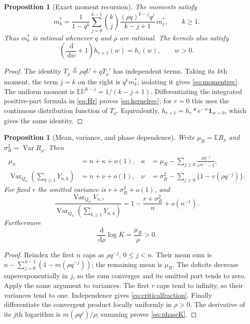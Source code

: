 \documentclass[11pt,oneside]{article}
\numberwithin{equation}{section}
\theoremstyle{plain}
\newtheorem{proposition}[theorem]{Proposition}
\theoremstyle{definition}
\theoremstyle{remark}
\newcommand{\E}{\mathbb E}
\newcommand{\ind}{\mathbf 1}
\newcommand{\dd}{\,\mathrm d}
\newcommand{\Var}{\operatorname{Var}}
\begin{document}
\begin{proposition}[Exact moment recursion]\label{prop:moments}
The moments satisfy
\begin{equation}\label{eq:momentrec}
 m_k^*=
 \frac1{1-q^k}\sum_{j=0}^{k-1}
 \binom kj\frac{(\rho q)^{k-j}q^j}{k-j+1}\,m_j^*,\qquad k\ge1.
\end{equation}
Thus $m_k^*$ is rational whenever $q$ and $\rho$ are rational. The
kernels also satisfy
\begin{equation}\label{eq:kernelrec}
 \left(\frac{\dd}{\dd w}+1\right)h_{r+1}(w)=h_r(w),\qquad w>0.
\end{equation}
\end{proposition}
\begin{proof}
The identity $T_\rho\overset d=\rho qU+qT_\rho'$ has independent terms.
Taking its $k$th moment, the term $j=k$ on the right is $q^km_k^*$;
isolating it gives \eqref{eq:momentrec}. The uniform moment is
$\E U^{k-j}=1/(k-j+1)$. Differentiating the integrated positive-part
formula in \eqref{eq:Hr} proves \eqref{eq:kernelrec}; for $r=0$ this
uses the continuous distribution function of $T_\rho$. Equivalently,
$h_{r+1}=h_r*e^{-w}\ind_{w>0}$, which gives the same identity.
\end{proof}

\begin{proposition}[Mean, variance, and phase dependence]\label{prop:clock}
Write $\mu_R=\E R_\rho$ and $\sigma_R^2=\Var R_\rho$. Then
\begin{align}
 \mu_n&=n+\kappa+o(1),&
 \kappa&=\mu_R-\sum_{j\ge0}\frac{\rho q^{-j}}{e^{\rho q^{-j}}-1},
 \label{eq:kappa}\\
 \Var_{Q_n}\!\left(\sum_{k\ge1}Y_{n,k}\right)&=n+\nu+o(1),&
 \nu&=\sigma_R^2-\sum_{j\ge0}\{1-v(\rho q^{-j})\}.
 \label{eq:nu}
\end{align}
For fixed $r$ the omitted variance is $r+\sigma_R^2+o(1)$, and
\begin{equation}\label{eq:criticalfraction}
 \frac{\Var_{Q_n}V_{n,r}}
 {\Var_{Q_n}(\sum_{k\ge1}Y_{n,k})}
 =1-\frac{r+\sigma_R^2}{n}+o(n^{-1}).
\end{equation}
Furthermore
\begin{equation}\label{eq:phaseK}
 \frac{\dd}{\dd\rho}\log K=\frac{\mu_R}{\rho}>0.
\end{equation}
\end{proposition}
\begin{proof}
Reindex the first $n$ caps as $\rho q^{-j}$, $0\le j<n$. Their
mean sum is $n-\sum_{j=0}^{n-1}(1-m(\rho q^{-j}))$; the remaining
mean is $\mu_R$. The deficits decrease superexponentially in $j$, so
the sum converges and its omitted part tends to zero. Apply the same
argument to variances. The first $r$ caps tend to infinity, so their
variances tend to one. Independence gives \eqref{eq:criticalfraction}.
Finally differentiate the convergent product locally uniformly in
$\rho>0$. The derivative of its $j$th logarithm is
$m(\rho q^j)/\rho$; summing proves \eqref{eq:phaseK}.
\end{proof}
\end{document}
